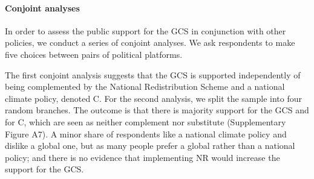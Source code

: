 \documentclass{nature}
\begin{document}
\paragraph{Conjoint analyses}\label{subsubsec:conjoint}%

In order to assess the public support for the GCS in conjunction with other policies, we conduct a series of conjoint analyses. We ask respondents to make five choices between pairs of political platforms.

The first conjoint analysis suggests that the GCS is supported independently of being complemented by the National Redistribution Scheme and a national climate policy, denoted C.  
For the second analysis, we split the sample into four random branches. %
The outcome is that there is majority support for the GCS and for C, which are seen as neither complement nor substitute (Supplementary Figure A7). A minor share of respondents like a national climate policy and dislike a global one, but as many people prefer a global rather than a national policy; and there is no evidence that implementing NR would increase the support for the GCS.
\end{document}
